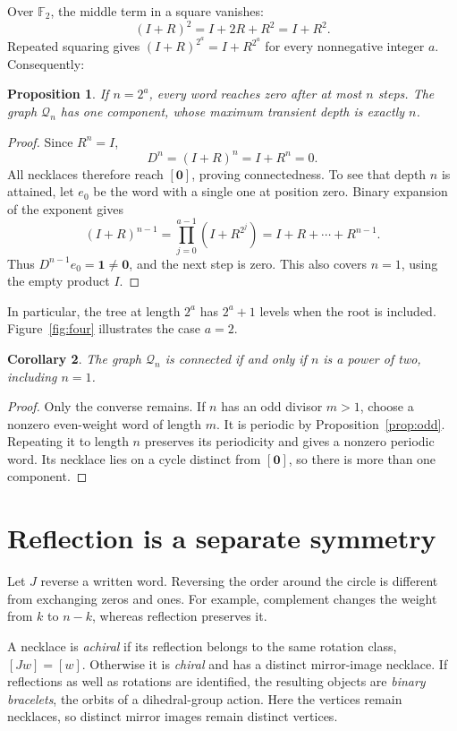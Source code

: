 \documentclass[11pt]{article}
\newtheorem{proposition}{Proposition}[section]
\newtheorem{corollary}[proposition]{Corollary}
\theoremstyle{definition}
\newcommand{\F}{\mathbb F_2}
\newcommand{\one}{\mathbf 1}
\newcommand{\zero}{\mathbf 0}
\numberwithin{equation}{section}
\begin{document}
Over $\F$, the middle term in a square vanishes:
\[
 (I+R)^2=I+2R+R^2=I+R^2.
\]
Repeated squaring gives $(I+R)^{2^a}=I+R^{2^a}$ for every nonnegative
integer $a$. Consequently:

\begin{proposition}\label{prop:power-two}
If $n=2^a$, every word reaches zero after at most $n$ steps. The
graph $\mathcal Q_n$ has one component, whose maximum transient
depth is exactly $n$.
\end{proposition}
\begin{proof}
Since $R^n=I$,
\[
 D^n=(I+R)^n=I+R^n=0.
\]
All necklaces therefore reach $[\zero]$, proving connectedness.
To see that depth $n$ is attained, let $e_0$ be the word with a single
one at position zero. Binary expansion of the exponent gives
\[
 (I+R)^{n-1}=\prod_{j=0}^{a-1}(I+R^{2^j})
 =I+R+\cdots+R^{n-1}.
\]
Thus $D^{n-1}e_0=\one\ne\zero$, and the next step is zero.
This also covers $n=1$, using the empty product $I$.
\end{proof}

In particular, the tree at length $2^a$ has $2^a+1$ levels when the
root is included. Figure~\ref{fig:four} illustrates the case $a=2$.

\begin{corollary}\label{cor:connected}
The graph $\mathcal Q_n$ is connected if and only if $n$ is a power
of two, including $n=1$.
\end{corollary}
\begin{proof}
Only the converse remains. If $n$ has an odd divisor $m>1$, choose
a nonzero even-weight word of length $m$. It is periodic by
Proposition~\ref{prop:odd}. Repeating it to length $n$ preserves its
periodicity and gives a nonzero periodic word. Its necklace lies on
a cycle distinct from $[\zero]$, so there is more than one component.
\end{proof}

\section{Reflection is a separate symmetry}\label{sec:reflection}

Let $J$ reverse a written word. Reversing the order around the circle
is different from exchanging zeros and ones. For example, complement
changes the weight from $k$ to $n-k$, whereas reflection preserves it.

A necklace is \emph{achiral} if its reflection belongs to the same
rotation class, $[Jw]=[w]$. Otherwise it is \emph{chiral} and has a
distinct mirror-image necklace. If reflections as well as rotations
are identified, the resulting objects are \emph{binary bracelets},
the orbits of a dihedral-group action. Here the vertices remain
necklaces, so distinct mirror images remain distinct vertices.
\end{document}

